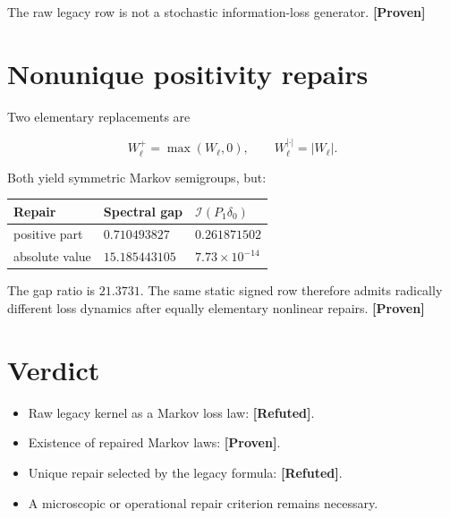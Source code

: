 \documentclass[11pt,a4paper,openany]{report}
\newcommand{\statusProven}{\textcolor{fingreen}{[Proven]}}
\newcommand{\statusRefuted}{\textcolor{finred}{[Refuted]}}
\begin{document}
The raw legacy row is not a stochastic information-loss generator. \textbf{\statusProven{}}

\section{Nonunique positivity repairs}

Two elementary replacements are

\[
W_\ell^+=\max(W_\ell,0),
\qquad
W_\ell^{|\cdot|}=|W_\ell|.
\]

Both yield symmetric Markov semigroups, but:

\begin{center}
\begingroup\small
\setlength{\tabcolsep}{3.5pt}
\renewcommand{\arraystretch}{1.16}
\begin{longtable}{@{}p{}p{}p{}@{}}
\toprule
\textbf{Repair} & \textbf{Spectral gap} & \textbf{\(\mathcal{I}(P_1\delta_0)\)} \\
\midrule
\endhead
positive part & \(0.710493827\) & \(0.261871502\) \\
absolute value & \(15.185443105\) & \(7.73\times10^{-14}\) \\
\bottomrule
\end{longtable}
\endgroup
\end{center}

The gap ratio is \(21.3731\). The same static signed row therefore admits radically different loss dynamics after equally elementary nonlinear repairs. \textbf{\statusProven{}}

\section{Verdict}

\begin{itemize}
\item 
Raw legacy kernel as a Markov loss law: \textbf{\statusRefuted{}}.

\item 
Existence of repaired Markov laws: \textbf{\statusProven{}}.

\item 
Unique repair selected by the legacy formula: \textbf{\statusRefuted{}}.

\item 
A microscopic or operational repair criterion remains necessary.

\end{itemize}
\end{document}
